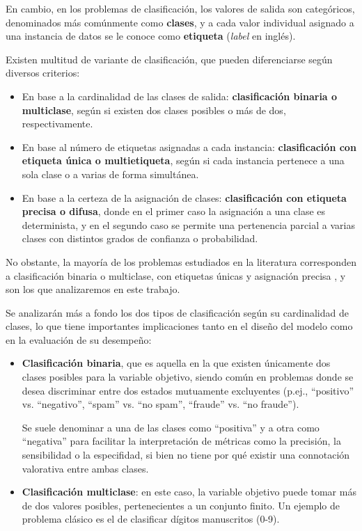 En cambio, en los problemas de clasificación, los valores de salida son categóricos, denominados más comúnmente como
\textbf{clases}, y a cada valor individual asignado a una instancia de datos se le conoce como \textbf{etiqueta} 
(\textit{label} en inglés).

Existen multitud de variante de clasificación, que pueden diferenciarse según diversos criterios:

\begin{itemize}
    \item En base a la cardinalidad de las clases de salida: \textbf{clasificación binaria o multiclase}, según 
    si existen dos clases posibles o más de dos, respectivamente.

    \item En base al número de etiquetas asignadas a cada instancia: \textbf{clasificación con etiqueta única o 
    multietiqueta}, según si cada instancia pertenece a una sola clase o a varias de forma simultánea.

    \item En base a la certeza de la asignación de clases: \textbf{clasificación con etiqueta precisa o difusa}, 
    donde en el primer caso la asignación a una clase es determinista, y en el segundo caso se permite una 
    pertenencia parcial a varias clases con distintos grados de confianza o probabilidad.
    
\end{itemize}

No obstante, la mayoría de los problemas estudiados en la literatura corresponden a clasificación binaria o 
multiclase, con etiquetas únicas y asignación precisa \cite{bishop2006}, y son los que analizaremos en este
trabajo.

Se analizarán más a fondo los dos tipos de clasificación según su cardinalidad de clases, lo que tiene 
importantes implicaciones tanto en el diseño del modelo como en la evaluación de su desempeño: 

\begin{itemize}

    \item \textbf{Clasificación binaria}, que es aquella en la que existen únicamente dos clases posibles para la 
    variable objetivo, siendo común en problemas donde se desea discriminar entre dos estados mutuamente 
    excluyentes (p.ej., ``positivo'' vs. ``negativo'', ``spam'' vs. ``no spam'', ``fraude'' vs. ``no fraude'').
    
    Se suele denominar a una de las clases como ``positiva'' y a otra como ``negativa'' para facilitar la 
    interpretación de métricas como la precisión, la sensibilidad o la especifidad, si bien no tiene por qué 
    existir una connotación valorativa entre ambas clases.
    
    \item \textbf{Clasificación multiclase}: en este caso, la variable objetivo puede tomar más de dos valores 
    posibles, pertenecientes a un conjunto finito. Un ejemplo de problema clásico es el de clasificar dígitos
    manuscritos (0-9).

\end{itemize}


